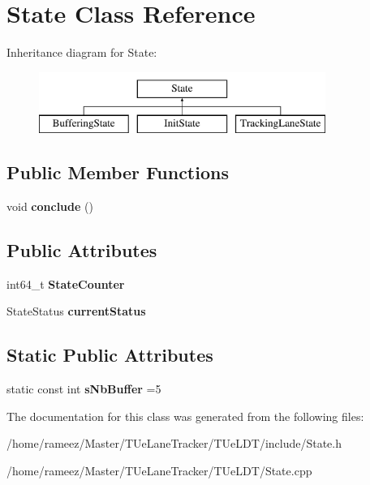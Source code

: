 \hypertarget{classState}{\section{State Class Reference}
\label{classState}
}
Inheritance diagram for State\-:\begin{figure}[H]
\begin{center}
\leavevmode
\includegraphics[height=2.000000cm]{classState}
\end{center}
\end{figure}
\subsection*{Public Member Functions}
\begin{DoxyCompactItemize}
\item 
\hypertarget{classState_ad499053c72a0b21c5c9e50456e8f01da}{void {\bfseries conclude} ()}\label{classState_ad499053c72a0b21c5c9e50456e8f01da}

\end{DoxyCompactItemize}
\subsection*{Public Attributes}
\begin{DoxyCompactItemize}
\item 
\hypertarget{classState_acc98ede8633918c2077fbc204b4b6bad}{int64\-\_\-t {\bfseries State\-Counter}}\label{classState_acc98ede8633918c2077fbc204b4b6bad}

\item 
\hypertarget{classState_a62a87cbab86fe461f6a66c98a98abac0}{State\-Status {\bfseries current\-Status}}\label{classState_a62a87cbab86fe461f6a66c98a98abac0}

\end{DoxyCompactItemize}
\subsection*{Static Public Attributes}
\begin{DoxyCompactItemize}
\item 
\hypertarget{classState_a753c5c7247802fe071e3d8d73e5733f7}{static const int {\bfseries s\-Nb\-Buffer} =5}\label{classState_a753c5c7247802fe071e3d8d73e5733f7}

\end{DoxyCompactItemize}


The documentation for this class was generated from the following files\-:\begin{DoxyCompactItemize}
\item 
/home/rameez/\-Master/\-T\-Ue\-Lane\-Tracker/\-T\-Ue\-L\-D\-T/include/State.\-h\item 
/home/rameez/\-Master/\-T\-Ue\-Lane\-Tracker/\-T\-Ue\-L\-D\-T/State.\-cpp\end{DoxyCompactItemize}
